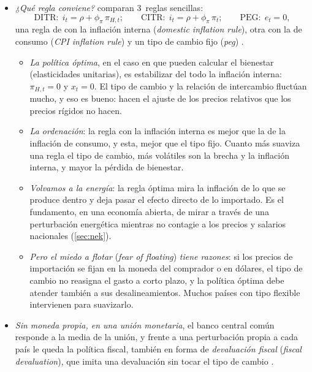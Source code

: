 \documentclass[11pt]{article}
\begin{document}
\begin{itemize}
\item \emph{¿Qué regla conviene?} \textcite{GaliMonacelli2005Monetary} comparan 3~reglas sencillas:
  \begin{equation}
  \text{DITR:}\ \ i_t=\rho+\phi_{\pi}\,\pi_{H,t};\qquad \text{CITR:}\ \ i_t=\rho+\phi_{\pi}\,\pi_t;\qquad \text{PEG:}\ \ e_t=0, \label{eq:reglas-gm}
  \end{equation}
  una regla de  con la inflación interna (\emph{domestic inflation  rule}), otra con la de consumo (\emph{CPI inflation  rule}) y un tipo de cambio fijo (\emph{peg}) .
  \begin{itemize}
  \item \emph{La política óptima}, en el caso en que pueden calcular el bienestar (elasticidades unitarias), es estabilizar del todo la inflación interna: $\pi_{H,t}=0$ y $x_t=0$. El tipo de cambio y la relación de intercambio fluctúan mucho, y eso es bueno: hacen el ajuste de los precios relativos que los precios rígidos no hacen.
  \item \emph{La ordenación}: la regla con la inflación interna es mejor que la de la inflación de consumo, y esta, mejor que el tipo fijo. Cuanto más suaviza una regla el tipo de cambio, más volátiles son la brecha y la inflación interna, y mayor la pérdida de bienestar.
  \item \emph{Volvamos a la energía}: la regla óptima mira la inflación de lo que se produce dentro y deja pasar el efecto directo de lo importado. Es el fundamento, en una economía abierta, de mirar a través de una perturbación energética mientras no contagie a los precios y salarios nacionales (\ref{sec:nek}).
  \item \emph{Pero el miedo a flotar} (\emph{fear of floating}) \emph{tiene razones}: si los precios de importación se fijan en la moneda del comprador o en dólares, el tipo de cambio no reasigna el gasto a corto plazo, y la política óptima debe atender también a sus desalineamientos\nocite{Engel2011Currency}. Muchos países con tipo flexible intervienen para suavizarlo\nocite{CalvoReinhart2002}.
  \end{itemize}
\item \emph{Sin moneda propia, en una unión monetaria}, el banco central común responde a la media de la unión, y frente a una perturbación propia a cada país le queda la política fiscal, también en forma de \emph{devaluación fiscal} (\emph{fiscal devaluation}), que imita una devaluación sin tocar el tipo de cambio\nocite{GaliMonacelli2008Optimal,FarhiGopinathItskhoki2014} .

\end{itemize}
\end{document}
